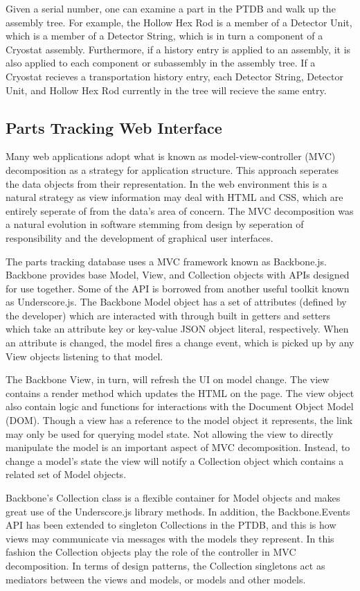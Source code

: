 \documentclass[journal]{IEEEtran}
\begin{document}
Given a serial number, one can examine a part in the PTDB and walk up the assembly tree. For example, the Hollow Hex Rod is a member
of a Detector Unit, which is a member of a Detector String, which is in turn a component of a Cryostat assembly. Furthermore,
if a history entry is applied to an assembly, it is also applied to each component or sub\-assembly in the assembly tree. If a Cryostat recieves
a transportation history entry, each Detector String, Detector Unit, and Hollow Hex Rod currently in the tree will recieve the same entry.

\subsection{Parts Tracking Web Interface}
Many web applications adopt what is known as model-view-controller (MVC) decomposition
as a strategy for application structure. This approach seperates the data objects from
their representation. In the web environment this is a natural strategy as view information
may deal with HTML and CSS, which are entirely seperate of from the data's area of concern.
The MVC decomposition was a natural evolution in software stemming from design by
seperation of responsibility and the development of graphical user interfaces.

The parts tracking database uses a MVC framework known as Backbone.js. Backbone provides
base Model, View, and Collection objects with APIs designed for use together. Some of the
API is borrowed from another useful toolkit known as Underscore.js. The Backbone Model 
object has a set of attributes (defined by the developer) which are interacted with through
built in getters and setters which take an attribute key or key-value JSON object literal,
respectively. When an attribute is changed, the model fires a change event, which is picked
up by any View objects listening to that model.

The Backbone View, in turn, will refresh the UI on model change. The view contains a render
method which updates the HTML on the page. The view object also contain logic and functions
for interactions with the Document Object Model (DOM). Though a view has a reference to the model object it represents,
the link may only be used for querying model state. Not allowing the view to directly manipulate
the model is an important aspect of MVC decomposition. Instead, to change a model's state the
view will notify a Collection object which contains a related set of Model objects.

Backbone's Collection class is a flexible container for Model objects and makes great use
of the Underscore.js library methods. In addition, the Backbone.Events API has been extended
to singleton Collections in the PTDB, and this is how views may communicate via messages
with the models they represent. In this fashion the Collection objects play the role of
the controller in MVC decomposition. In terms of design patterns, the Collection singletons 
act as mediators between the views and models, or models and other models.
\end{document}
